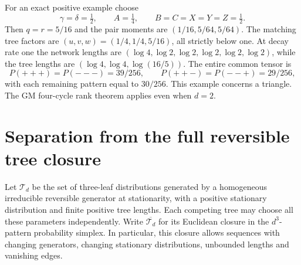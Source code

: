 \documentclass[11pt]{article}
\theoremstyle{definition}
\theoremstyle{remark}
\begin{document}
For an exact positive example choose
\[
 \gamma=\delta=\tfrac12,\qquad A=\tfrac14,
 \qquad B=C=X=Y=Z=\tfrac12.
\]
Then $q=r=5/16$ and the pair moments are
$(1/16,5/64,5/64)$. The matching tree factors are
$(u,v,w)=(1/4,1/4,5/16)$, all strictly below one. At decay rate one the
network lengths are $(\log4,\log2,\log2,\log2,\log2,\log2)$, while
the tree lengths are $(\log4,\log4,\log(16/5))$. The entire common tensor
is
\[
 P(+++) = P(---)=39/256,\qquad
 P(++-) = P(--+)=29/256,
\]
with each remaining pattern equal to $30/256$.
This example concerns a triangle. The GM four-cycle rank theorem applies
even when $d=2$.

\section{Separation from the full reversible tree closure}\label{sec:closure}

Let $\mathcal T_d$ be the set of three-leaf distributions generated by a
homogeneous irreducible reversible generator at stationarity, with a
positive stationary distribution and finite positive tree lengths.
Each competing tree may choose all these parameters independently.
Write $\overline{\mathcal T_d}$ for its Euclidean closure in the
$d^3$-pattern probability simplex. In particular, this closure allows
sequences with changing generators, changing stationary distributions,
unbounded lengths and vanishing edges.
\end{document}
